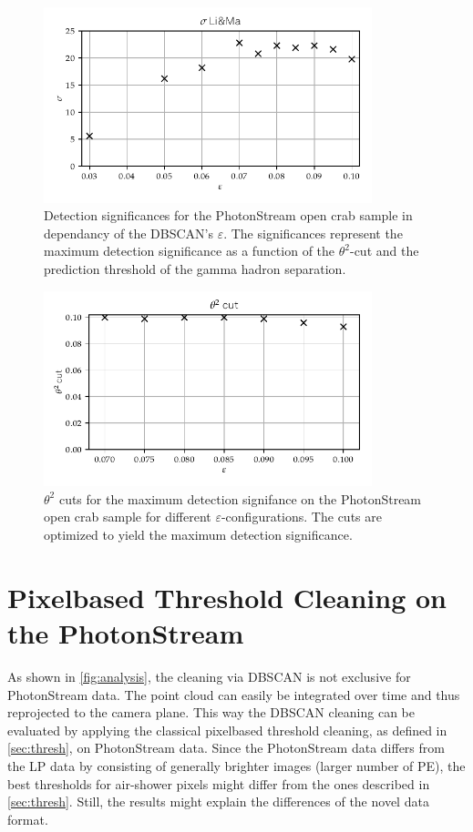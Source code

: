 %
\begin{figure}
  \centering
  \includegraphics[width=0.85\textwidth]{Plots/Epsilon/eps_sigma.pdf}
  \caption{Detection significances for the PhotonStream open crab sample in dependancy of the DBSCAN's $\varepsilon$. The significances represent the maximum detection significance as a function of the $\theta^2$-cut and the prediction threshold of the gamma hadron separation.}
  \label{fig:eps_sigma}
\end{figure}
%
\begin{figure}
  \centering
  \includegraphics[width=0.85\textwidth]{Plots/Epsilon/eps_theta_cut.pdf}
  \caption{$\theta^2$ cuts for the maximum detection signifance on the PhotonStream open crab sample for different $\varepsilon$-configurations. The cuts are optimized to yield the maximum detection significance.}
  \label{fig:eps_theta}
\end{figure}

\section{Pixelbased Threshold Cleaning on the PhotonStream}
%
As shown in \autoref{fig:analysis}, the cleaning via DBSCAN is not exclusive
for PhotonStream data. The point cloud can easily be integrated over time and
thus reprojected to the camera plane. This way the DBSCAN cleaning can be
evaluated by applying the classical pixelbased threshold cleaning, as defined
in \autoref{sec:thresh}, on PhotonStream data. Since the PhotonStream data
differs from the LP data by consisting of generally brighter images (larger number
of PE), the best thresholds for air-shower pixels might differ from the ones
described in \autoref{sec:thresh}. Still, the results might explain the
differences of the novel data format.

